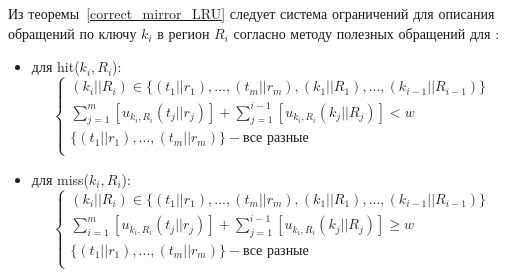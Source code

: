 Из теоремы~\ref{correct_mirror_LRU} следует система ограничений для
описания обращений по ключу $k_i$ в регион $R_i$ согласно методу полезных обращений для \LRU: \begin{itemize}
\item для hit($k_i, R_i$):
$$
\left\{\begin{array}{l} (k_i||R_i) \in \{(t_1||r_1), ..., (t_m||r_m), (k_1||R_1),
..., (k_{i-1}||R_{i-1})\}\\
\sum\limits_{j=1}^m [u_{k_i,R_i}(t_j||r_j)] + \sum\limits_{j=1}^{i-1} [u_{k_i,R_i}(k_j||R_j)] < w\\
\{(t_1||r_1), ..., (t_m||r_m)\} - \mbox{все разные}\\
\end{array} \right.
$$
\item для miss($k_i, R_i$):
$$
\left\{\begin{array}{l} (k_i||R_i) \in \{(t_1||r_1), ..., (t_m||r_m), (k_1||R_1),
..., (k_{i-1}||R_{i-1})\}\\
\sum\limits_{i=1}^m [u_{k_i,R_i}(t_j||r_j)] + \sum\limits_{j=1}^{i-1} [u_{k_i,R_i}(k_j||R_j)]
\geqslant w\\
\{(t_1||r_1), ..., (t_m||r_m)\} - \mbox{все разные}\\
\end{array} \right.
$$
\end{itemize}


%
%
%
%

